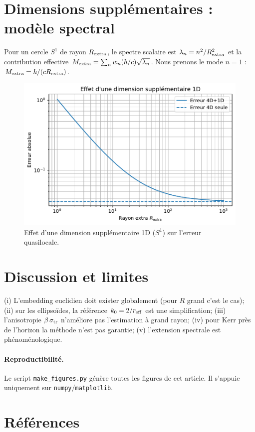 \documentclass[11pt]{article}
\begin{document}
\section{Dimensions suppl\'ementaires : mod\`ele spectral}
Pour un cercle $S^1$ de rayon $R_{\rm extra}$, le spectre scalaire est $\lambda_n=n^2/R_{\rm extra}^2$ et la contribution effective
$M_{\rm extra}=\sum_n w_n (\hbar/c)\sqrt{\lambda_n}$. Nous prenons le mode $n=1$ : $M_{\rm extra}=\hbar/(c R_{\rm extra})$.
\begin{figure}[!htb]
\centering
\includegraphics[width=.75\linewidth]{fig_extra_dimension_effect_improved.pdf}
\caption{Effet d'une dimension suppl\'ementaire 1D (\(S^1\)) sur l'erreur quasilocale.}
\end{figure}
\clearpage

\section{Discussion et limites}
(i) L'embedding euclidien doit exister globalement (pour $R$ grand c'est le cas); 
(ii) sur les ellipso\"ides, la r\'ef\'erence $k_0=2/r_{\rm eff}$ est une simplification; 
(iii) l'anisotropie $\beta\,\sigma_{\rm tr}$ n'am\'eliore pas l'estimation \`a grand rayon; 
(iv) pour Kerr pr\`es de l'horizon la m\'ethode n'est pas garantie; 
(v) l'extension spectrale est ph\'enom\'enologique.

\paragraph{Reproductibilit\'e.}
Le script \texttt{make\_figures.py} g\'en\`ere toutes les figures de cet article. Il s'appuie uniquement sur \texttt{numpy}/\texttt{matplotlib}.

\section*{R\'ef\'erences}
\end{document}
